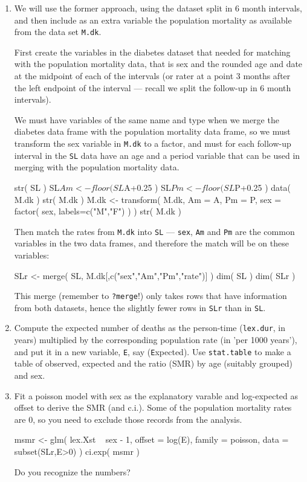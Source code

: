 \begin{enumerate}[resume]
\item We will use the former approach, using the dataset split in
  6 month intervals, and then include as an extra variable the
  population mortality as available from the data set
  \texttt{M.dk}.

  First create the variables in the diabetes dataset that needed
  for matching with the population mortality data, that is sex and
  the rounded age and date at the midpoint of each of the intervals
  (or rater at a point 3 months after the left endpoint of the
  interval --- recall we split the follow-up in 6 month intervals).

  We must have variables of the same name and type when we merge
  the diabetes data frame with the population mortality data frame,
  so we must transform the sex variable in \texttt{M.dk} to a
  factor, and must for each follow-up interval in the \texttt{SL}
  data have an age and a period variable that can be used in
  merging with the population mortality data.
\begin{Schunk}
\begin{Sinput}
 str( SL )
 SL$Am <- floor( SL$A+0.25 )
 SL$Pm <- floor( SL$P+0.25 )
 data( M.dk )
 str( M.dk )
 M.dk <- transform( M.dk, Am = A,
                          Pm = P,
                         sex = factor( sex, labels=c("M","F") ) )
 str( M.dk )
\end{Sinput}
\end{Schunk}
Then match the rates from \texttt{M.dk} into \texttt{SL} ---
\texttt{sex}, \texttt{Am} and \texttt{Pm} are the common variables
in the two data frames, and therefore the match will be on these
variables:
\begin{Schunk}
\begin{Sinput}
 SLr <- merge( SL, M.dk[,c("sex","Am","Pm","rate")] )
 dim( SL )
 dim( SLr )
\end{Sinput}
\end{Schunk}
This merge (remember to \texttt{?merge}!) only takes rows that have
information from both datasets, hence the slightly fewer rows in
\texttt{SLr} than in \texttt{SL}.
\item Compute the expected number of deaths as the person-time
  (\texttt{lex.dur}, in years) multiplied by the corresponding population
  rate (in 'per 1000 years'), and put it in a new variable, \texttt{E}, say
  (\texttt{E}xpected). Use \texttt{stat.table} to make a table of
  observed, expected and the ratio (SMR) by age (suitably grouped)
  and sex.
\item Fit a poisson model with sex as the explanatory varable and
  log-expected as offset to derive the SMR (and c.i.).
  Some of the population mortality rates are 0, so you need to exclude
  those records from the analysis.
\begin{Schunk}
\begin{Sinput}
 msmr <- glm( lex.Xst ~ sex - 1,
              offset = log(E),
              family = poisson,
                data = subset(SLr,E>0) )
 ci.exp( msmr )
\end{Sinput}
\end{Schunk}
  Do you recognize the numbers?
     

\end{enumerate}
